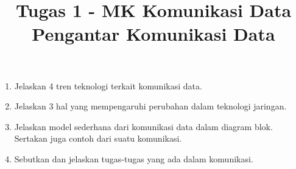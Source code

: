 \documentclass[12pt,a4paper]{article}
\begin{document}
	\title{Tugas 1 - MK Komunikasi Data \\
			Pengantar Komunikasi Data}
	\maketitle
	
	\begin{enumerate}
		\item Jelaskan 4 tren teknologi terkait komunikasi data.
		\item Jelaskan 3 hal yang mempengaruhi perubahan dalam teknologi jaringan.
		\item Jelaskan model sederhana dari komunikasi data dalam diagram blok. Sertakan juga contoh dari suatu komunikasi.
		\item Sebutkan dan jelaskan tugas-tugas yang ada dalam komunikasi.
	\end{enumerate}
\end{document}
